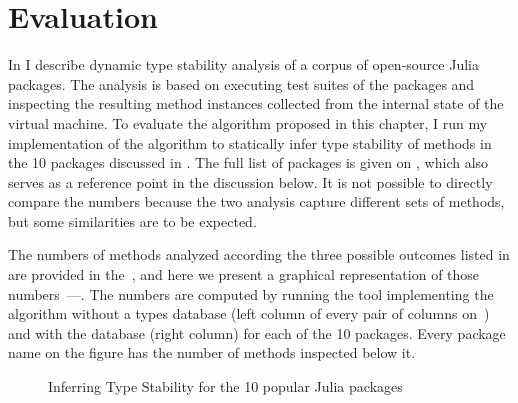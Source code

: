 \section{Evaluation}%
\label{sec:approx:eval}

In  I describe dynamic type stability analysis of a
corpus of open-source Julia packages. The analysis is based on executing test
suites of the packages and inspecting the resulting method instances collected
from the internal state of the virtual machine. To evaluate the algorithm
proposed in this chapter, I run my implementation of the algorithm to statically
infer type stability of methods in the 10 packages discussed in
. The full list of packages is given on
, which also serves as a reference
point in the discussion below.
It is not possible to directly compare the numbers because the
two analysis capture different sets of methods, but some similarities are to be
expected.


The numbers of methods analyzed according the three possible outcomes listed in
 are provided in the~, and here
we present a graphical representation of those
numbers~---. The numbers are computed by running the
tool implementing the algorithm without a types database (left column of every
pair of columns on~) and with the database (right
column) for each of the 10 packages. Every package name on the figure has the number of
methods inspected below it.

\begin{figure}[ht]
\caption{Inferring Type Stability for the 10 popular Julia packages}%
\label{figs:approx:eval}
\end{figure}

